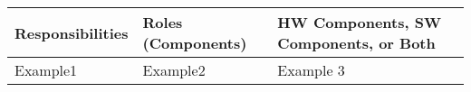 \documentclass[RRC.tex]{subfiles}
\begin{document}
\bigskip

\begin{center}
	\begin{tabular}{ | p{5cm} | p{5cm} | p{5cm} |}
		\hline
		Responsibilities & Roles (Components) & HW Components, SW Components, or Both \\ \hline
		Example1 & Example2 & Example 3 \\ \hline
	\end{tabular}
\end{center}
\end{document}
